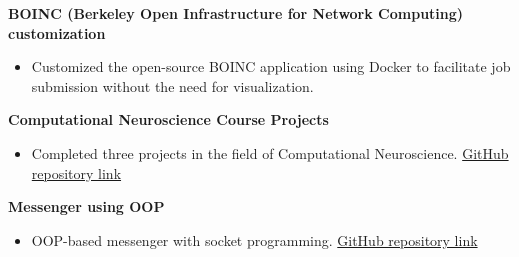 \documentclass[a4paper,10pt]{article}
\begin{document}
\textbf{BOINC (Berkeley Open Infrastructure for Network Computing) customization}
\begin{itemize}
  \item Customized the open-source BOINC application using Docker to facilitate job submission without the need for visualization.
\end{itemize}

\textbf{Computational Neuroscience Course Projects}
\begin{itemize}
  \item Completed three projects in the field of Computational Neuroscience. \href{https://github.com/sepehr-mousaviyan/ComputationalNeuroscienceProjects/tree/main/Projects/SepehrMousaviyan-99222099}{GitHub repository link}
\end{itemize}

\textbf{Messenger using OOP}
\begin{itemize}
  \item OOP-based messenger with socket programming. \href{https://github.com/sepehr-mousaviyan/Jeez-Massanger}{GitHub repository link}
\end{itemize}



\end{document}
